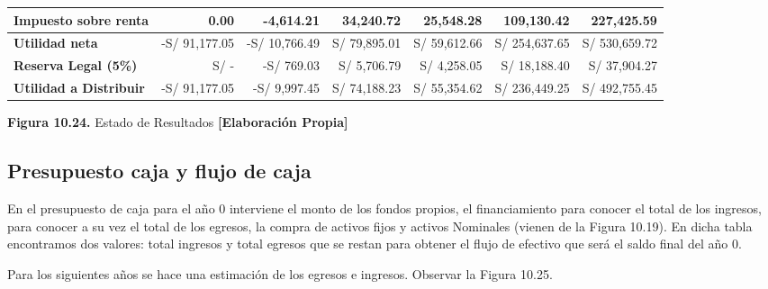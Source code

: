 \begin{table}[H]
\begin{tabular}{|p{3.5cm}|r|r|r|r|r|r|}
Impuesto sobre renta 
& 0.00 & -4,614.21 & 34,240.72 & 25,548.28 & 109,130.42 & 227,425.59 \\ \hline

\textbf{Utilidad neta} 
& -S/ 91,177.05 & -S/ 10,766.49 & S/ 79,895.01 & S/ 59,612.66 & S/ 254,637.65 & S/ 530,659.72 \\ \hline

\textbf{Reserva Legal (5\%)} 
& S/ - & -S/ 769.03 & S/ 5,706.79 & S/ 4,258.05 & S/ 18,188.40 & S/ 37,904.27 \\ \hline

\textbf{Utilidad a Distribuir} 
& -S/ 91,177.05 & -S/ 9,997.45 & S/ 74,188.23 & S/ 55,354.62 & S/ 236,449.25 & S/ 492,755.45 \\ \hline

\end{tabular}

\vspace{0.2cm}
\textbf{Figura 10.24.} Estado de Resultados \textbf{[Elaboración Propia]}
\end{table}

\subsection{Presupuesto caja y flujo de caja}

En el presupuesto de caja para el año 0 interviene el monto de los fondos propios, el financiamiento para conocer el total de los ingresos, para conocer a su vez el total de los egresos, la compra de activos fijos y activos Nominales (vienen de la Figura 10.19). En dicha tabla encontramos dos valores: total ingresos y total egresos que se restan para obtener el flujo de efectivo que será el saldo final del año 0.

Para los siguientes años se hace una estimación de los egresos e ingresos. Observar la Figura 10.25.
